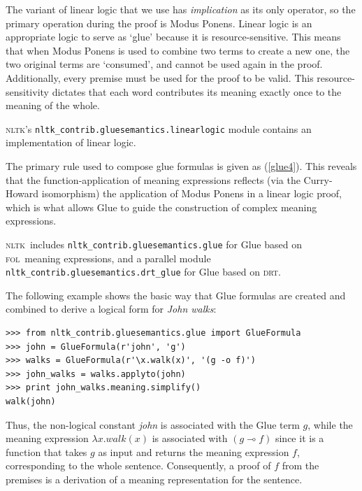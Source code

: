 \documentclass[11pt,a4paper]{article}
\newcommand{\DRT}{\textsc{drt}}
\newcommand{\FOL}{\textsc{fol}}
\newcommand{\NLTK}{\textsc{nltk}}
\newcommand{\dhgcode}[1]{{\tt #1}}
\begin{document}
The variant of linear logic that we use has \emph{implication} as its
only operator, so the primary operation during the proof is Modus
Ponens.  Linear logic is an appropriate logic to serve as `glue'
because it is resource-sensitive.  This means that when Modus Ponens
is used to combine two terms to create a new one, the two original
terms are `consumed', and cannot be used again in the proof.
Additionally, every premise must be used for the proof to be valid.
This resource-sensitivity dictates that each word contributes its
meaning exactly once to the meaning of the whole.

\NLTK's \dhgcode{nltk\_contrib.gluesemantics.linearlogic} module
contains an implementation of linear logic. 

The primary rule used to compose glue formulas is given as
(\ref{glue4}).  This reveals that the function-application of meaning
expressions reflects (via the Curry-Howard isomorphism) the
application of Modus Ponens in a linear logic proof, which
is what allows Glue to guide the construction of complex meaning expressions.

\NLTK\ includes
\dhgcode{nltk\_contrib.gluesemantics.glue} for Glue based on \FOL\
meaning expressions, and a parallel module
\dhgcode{nltk\_contrib.gluesemantics.drt\_glue} for Glue based on \DRT.  

The following example shows the basic way that
Glue formulas are created and combined to derive a logical form for
\textit{John walks}: 

\begin{verbatim}
>>> from nltk_contrib.gluesemantics.glue import GlueFormula
>>> john = GlueFormula(r'john', 'g')
>>> walks = GlueFormula(r'\x.walk(x)', '(g -o f)')
>>> john_walks = walks.applyto(john)
>>> print john_walks.meaning.simplify()
walk(john)
\end{verbatim}
Thus, the non-logical constant \textit{john} is associated with the
Glue term $g$, while the meaning expression $\lambda x.walk(x)$ is
associated with $(g \multimap f)$ since it is a function that
takes $g$ as input and returns the meaning expression $f$,
corresponding to the whole
sentence.  Consequently, a proof of $f$ from the premises is a derivation
of a meaning representation for the sentence.
\end{document}
